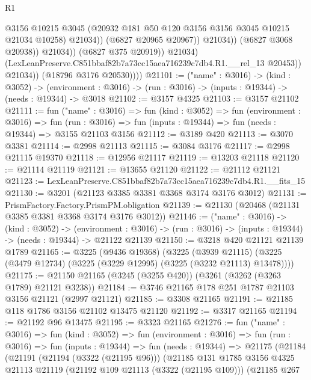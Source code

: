 \begin{lexlean}{R1}
\begin{coremodule}
                                    @3156
                                    @10215
                                    @3045
                                    (@20932 @181 @50 @120 @3156 @3156 @3045 @10215 @21034 @10258)
                                    @21034))
                                (@6827 @20965 @20967))
                              @21034))
                          (@6827 @3068 @20938))
                        @21034))
                    (@6827 @375 @20919))
                  @21034)
                (LexLeanPreserve.C851bbaf82b7a73cc15aea716239c7db4.R1.__rel_13 @20453))
              @21034))
          (@18796 @3176 @20530))))
@21101 := ("name" : @3016) ->
  (kind : @3052) ->
  (environment : @3016) -> (run : @3016) -> (inputs : @19344) -> (needs : @19344) -> @3018
@21102 := @3157 @4325
@21103 := @3157 @21102
@21111 := fun ("name" : @3016) =>
  fun (kind : @3052) =>
  fun (environment : @3016) =>
  fun (run : @3016) => fun (inputs : @19344) => fun (needs : @19344) => @3155 @21103 @3156
@21112 := @3189 @420
@21113 := @3070 @3381
@21114 := @2998 @21113
@21115 := @3084 @3176
@21117 := @2998 @21115 @19370
@21118 := @12956 @21117
@21119 := @13203 @21118
@21120 := @21114 @21119
@21121 := @13655 @21120
@21122 := @21112 @21121
@21123 := LexLeanPreserve.C851bbaf82b7a73cc15aea716239c7db4.R1.__fits_15
@21130 := @3201 (@21123 @3385 @3381 @3368 @3174 @3176 @3012)
@21131 := PrismFactory.Factory.PrismPM.obligation
@21139 := @21130 (@20468 (@21131 @3385 @3381 @3368 @3174 @3176 @3012))
@21146 := ("name" : @3016) ->
  (kind : @3052) ->
  (environment : @3016) -> (run : @3016) -> (inputs : @19344) -> (needs : @19344) -> @21122 @21139
@21150 := @3218 @420 @21121 @21139 @1789
@21165 := @3225
    (@9436 @19368)
    (@3225
      (@3939 @21115)
      (@3225 (@3479 @12734) (@3225 (@3229 @12995) (@3225 (@3232 @21113) @13478))))
@21175 := @21150 @21165 (@3245 (@3255 @420)) (@3261 (@3262 (@3263 @1789) @21121 @3238))
@21184 := @3746 @21165 @178 @251 @1787 @21103 @3156 @21121 (@2997 @21121)
@21185 := @3308 @21165
@21191 := @21185 @118 @1786 @3156 @21102 @13475 @21120
@21192 := @3317 @21165
@21194 := @21192 @96 @13475
@21195 := @3323 @21165
@21276 := fun ("name" : @3016) =>
  fun (kind : @3052) =>
  fun (environment : @3016) =>
  fun (run : @3016) =>
  fun (inputs : @19344) =>
  fun (needs : @19344) =>
  @21175
    (@21184
      (@21191
        (@21194 (@3322 (@21195 @96)))
        (@21185
          @131
          @1785
          @3156
          @4325
          @21113
          @21119
          (@21192 @109 @21113 (@3322 (@21195 @109)))
          (@21185
            @267

\end{coremodule}
\end{lexlean}
